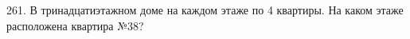 261. В тринадцатиэтажном доме на каждом этаже по 4 квартиры. На каком этаже расположена квартира №38?\\
